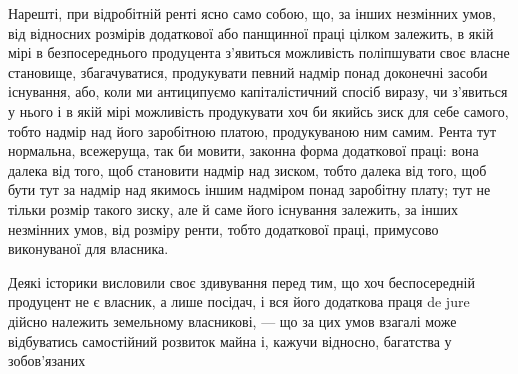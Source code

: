 Нарешті, при відробітній ренті ясно само собою, що, за інших незмінних
умов, від відносних розмірів додаткової або панщинної праці цілком залежить,
в якій мірі в безпосереднього продуцента з’явиться можливість поліпшувати
своє власне становище, збагачуватися, продукувати певний надмір понад доконечні
засоби існування, або, коли ми антиципуємо капіталістичний спосіб виразу,
чи з’явиться у нього і в якій мірі можливість продукувати хоч би якийсь
зиск для себе самого, тобто надмір над його заробітною платою, продукуваною
ним самим. Рента тут нормальна, всежеруща, так би мовити, законна форма
додаткової праці: вона далека від того, щоб становити надмір над зиском, тобто
далека від того, щоб бути тут за надмір над якимось іншим надміром понад
заробітну плату; тут не тільки розмір такого зиску, але й саме його існування
залежить, за інших незмінних умов, від розміру ренти, тобто додаткової праці,
примусово виконуваної для власника.

Деякі історики висловили своє здивування перед тим, що хоч беспосередній
продуцент не є власник, а лише посідач, і вся його додаткова праця de jure
дійсно належить земельному власникові, — що за цих умов взагалі може відбуватись
самостійний розвиток майна і, кажучи відносно, багатства у зобов’язаних
\parbreak{}  %
